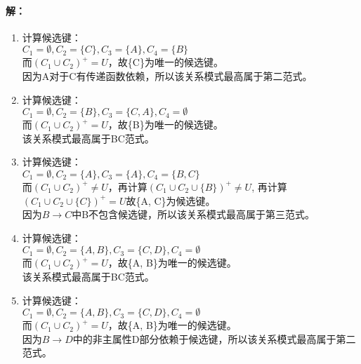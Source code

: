 \paragraph{解：}
\begin{enumerate}
	\item 计算候选键：\\
	$C_{1}=\emptyset, C_{2}=\{C\}, C_{3}=\{A\}, C_{4}=\{B\}$ \\
	而$(C_{1} \cup C_{2})^{+}=U$，故\{C\}为唯一的候选键。\\
	因为A对于C有传递函数依赖，所以该关系模式最高属于第二范式。
	
	\item 计算候选键：\\
	$C_{1}=\emptyset, C_{2}=\{B\}, C_{3}=\{C, A\}, C_{4}=\emptyset$ \\
	而$(C_{1} \cup C_{2})^{+}=U$，故\{B\}为唯一的候选键。\\
	该关系模式最高属于BC范式。
	
	\item 计算候选键：\\
	$C_{1}=\emptyset, C_{2}=\{A\}, C_{3}=\{A\}, C_{4}=\{B, C\}$ \\
	而$(C_{1} \cup C_{2})^{+} \neq U$，再计算$(C_{1} \cup C_{2} \cup \{B\})^{+} \neq U$, 再计算$(C_{1} \cup C_{2} \cup \{C\})^{+}=U$故\{A, C\}为候选键。\\
	因为$B \to C$中B不包含候选键，所以该关系模式最高属于第三范式。
	
	\item 计算候选键：\\
	$C_{1}=\emptyset, C_{2}=\{A, B\}, C_{3}=\{C, D\}, C_{4}=\emptyset$ \\
	而$(C_{1} \cup C_{2})^{+}=U$，故\{A, B\}为唯一的候选键。\\
	该关系模式最高属于BC范式。
	
	\item 计算候选键：\\
	$C_{1}=\emptyset, C_{2}=\{A, B\}, C_{3}=\{C, D\}, C_{4}=\emptyset$ \\
	而$(C_{1} \cup C_{2})^{+}=U$，故\{A, B\}为唯一的候选键。\\
	因为$B \to D$中的非主属性D部分依赖于候选键，所以该关系模式最高属于第二范式。
\end{enumerate}